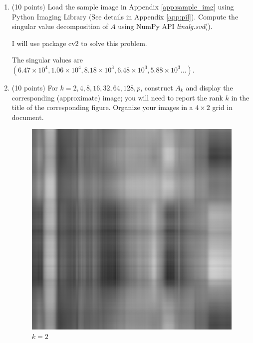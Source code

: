 \documentclass[10pt]{article}
\begin{document}
\begin{enumerate}[label=3.\arabic*]
    \item (10 points) 
    Load the sample image in Appendix \ref{app:sample_img} using Python Imaging Library (See details in Appendix \ref{app:pil}). Compute the singular value decomposition of $A$ using NumPy API \textit{linalg.svd}().\par
    I will use package cv2 to solve this problem.\par
    The singular values are $(6.47\times 10^4, 1.06\times 10^4,8.18\times 10^3,6.48\times 10^3,5.88\times 10^3...)$.
    \item (10 points)
    For $k=2,4,8,16,32,64,128,p$, construct $A_k$ and display the corresponding (approximate) image; you will need to report the rank $k$ in the title of the corresponding figure. Organize your images in a $4\times2$ grid in document.
 	\begin{figure}[H]
    	\centering
    	\begin{minipage}[c]{0.45\textwidth} 
    		\centering
    		\includegraphics[width=1\textwidth]{SVD/k = 2.png}
    		\caption{$k=2$}
    	\end{minipage}%
    	\begin{minipage}[c]{0.45\textwidth}
    		\centering

\end{minipage}
\end{figure}
\end{enumerate}
\end{document}
